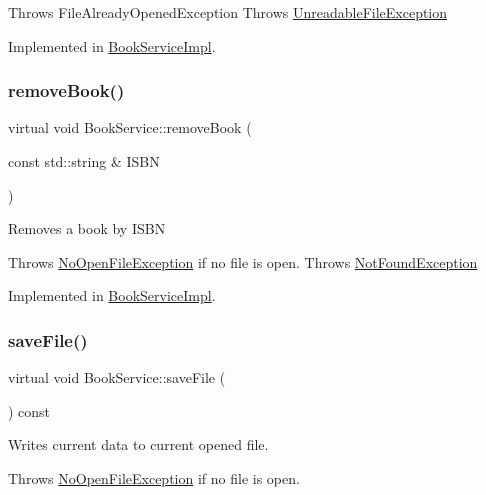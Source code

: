 Throws File\+Already\+Opened\+Exception Throws \hyperlink{structUnreadableFileException}{Unreadable\+File\+Exception} 

Implemented in \hyperlink{classBookServiceImpl_ab95aca2128c3abe9826a54ba4efff14b}{Book\+Service\+Impl}.

\mbox{\label{classBookService_ad5736bdaca83fcfeb262b6af0ec5967a}} 
\subsubsection{\texorpdfstring{remove\+Book()}{removeBook()}}
{\footnotesize\ttfamily virtual void Book\+Service\+::remove\+Book (\begin{DoxyParamCaption}\item[{const std\+::string \&}]{I\+S\+BN }\end{DoxyParamCaption})\hspace{0.3cm}{\ttfamily [pure virtual]}}

Removes a book by I\+S\+BN

Throws \hyperlink{structNoOpenFileException}{No\+Open\+File\+Exception} if no file is open. Throws \hyperlink{classNotFoundException}{Not\+Found\+Exception} 

Implemented in \hyperlink{classBookServiceImpl_ad0673fa9012b0454b0cbed190bcdc6e4}{Book\+Service\+Impl}.

\mbox{\label{classBookService_ade2db5e76a84d7535d43e307d955d9c3}} 
\subsubsection{\texorpdfstring{save\+File()}{saveFile()}}
{\footnotesize\ttfamily virtual void Book\+Service\+::save\+File (\begin{DoxyParamCaption}{ }\end{DoxyParamCaption}) const\hspace{0.3cm}{\ttfamily [pure virtual]}}

Writes current data to current opened file.

Throws \hyperlink{structNoOpenFileException}{No\+Open\+File\+Exception} if no file is open. 

